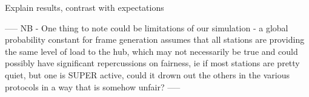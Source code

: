 \documentclass[twocolumn]{article}
\begin{document}
Explain results, contrast with expectations

-----
NB -
One thing to note could be limitations of our simulation - a global probability constant 
for frame generation assumes that all stations are providing the same level of load to 
the hub, which may not necessarily be true and could possibly have significant
repercussions on fairness, ie if most stations are pretty quiet, but one is SUPER active,
could it drown out the others in the various protocols in a way that is somehow unfair?
-----

%
%
%
\end{document}
